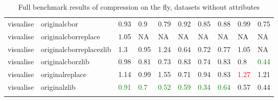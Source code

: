 \begin{landscape}
\begin{longtable}{llllllllll}
visualise & originalcbor & 0.93 & 0.9 & 0.79 & 0.92 & 0.85 & 0.88 & 0.99 & 0.75\\
visualise & originalcborreplace & 1.05 & NA & NA & NA & NA & NA & NA & NA\\
visualise & originalcborreplacezlib & 1.3 & 0.95 & 1.24 & 0.64 & 0.72 & 0.77 & 1.05 & NA\\
visualise & originalcborzlib & 0.98 & 0.81 & 0.73 & 0.83 & 0.74 & 0.83 & 0.8 & \textcolor{green}{0.44}\\
visualise & originalreplace & 1.14 & 0.99 & 1.55 & 0.71 & 0.94 & 0.83 & \textcolor{red}{1.27} & 1.21\\
visualise & originalzlib & \textcolor{green}{0.91} & \textcolor{green}{0.7} & \textcolor{green}{0.52} & \textcolor{green}{0.59} & \textcolor{green}{0.34} & \textcolor{green}{0.64} & 0.57 & 0.44\\*
\caption{Full benchmark results of compression on the fly, datasets without attributes}
\label{tab:fullresultsotfnoattr}
\end{longtable}


\end{landscape}